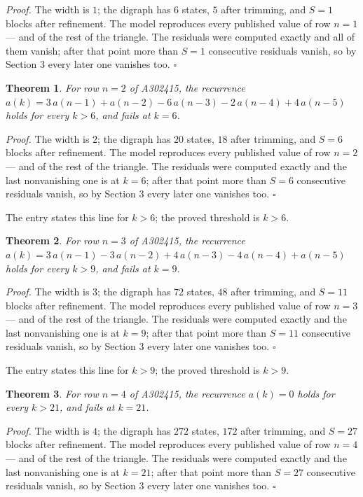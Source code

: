 \documentclass[11pt]{article}
\newtheorem{theorem}{Theorem}
\theoremstyle{definition}
\begin{document}
{\itshape Proof.} The width is $1$; the digraph has $6$ states, $5$ after trimming, and $S = 1$ blocks after refinement. The model reproduces every published value of row $n = 1$ --- and of the rest of the triangle. The residuals were computed exactly and all of them vanish; after that point more than $S = 1$ consecutive residuals vanish, so by Section 3 every later one vanishes too. $\square$

\begin{theorem} For row $n = 2$ of A302415, the recurrence $a(k) = 3\,a(n-1) + a(n-2) - 6\,a(n-3) - 2\,a(n-4) + 4\,a(n-5)$ holds for every $k > 6$, and fails at $k = 6$.\end{theorem}

{\itshape Proof.} The width is $2$; the digraph has $20$ states, $18$ after trimming, and $S = 6$ blocks after refinement. The model reproduces every published value of row $n = 2$ --- and of the rest of the triangle. The residuals were computed exactly and the last nonvanishing one is at $k = 6$; after that point more than $S = 6$ consecutive residuals vanish, so by Section 3 every later one vanishes too. $\square$

The entry states this line for $k > 6$; the proved threshold is $k > 6$.

\begin{theorem} For row $n = 3$ of A302415, the recurrence $a(k) = 3\,a(n-1) - 3\,a(n-2) + 4\,a(n-3) - 4\,a(n-4) + a(n-5)$ holds for every $k > 9$, and fails at $k = 9$.\end{theorem}

{\itshape Proof.} The width is $3$; the digraph has $72$ states, $48$ after trimming, and $S = 11$ blocks after refinement. The model reproduces every published value of row $n = 3$ --- and of the rest of the triangle. The residuals were computed exactly and the last nonvanishing one is at $k = 9$; after that point more than $S = 11$ consecutive residuals vanish, so by Section 3 every later one vanishes too. $\square$

The entry states this line for $k > 9$; the proved threshold is $k > 9$.

\begin{theorem} For row $n = 4$ of A302415, the recurrence $a(k) = 0$ holds for every $k > 21$, and fails at $k = 21$.\end{theorem}

{\itshape Proof.} The width is $4$; the digraph has $272$ states, $172$ after trimming, and $S = 27$ blocks after refinement. The model reproduces every published value of row $n = 4$ --- and of the rest of the triangle. The residuals were computed exactly and the last nonvanishing one is at $k = 21$; after that point more than $S = 27$ consecutive residuals vanish, so by Section 3 every later one vanishes too. $\square$
\end{document}
